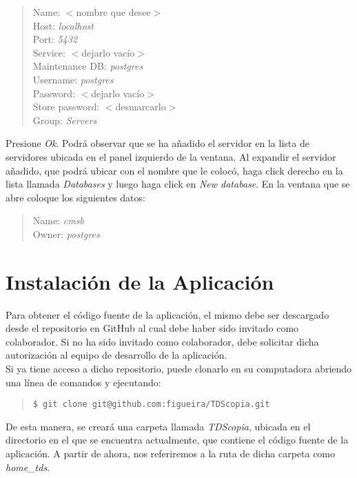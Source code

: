 \documentclass[12pt,a4paper]{article}
\begin{document}
\begin{quote}
Name: $<$nombre que desee$>$ \\
Host: \emph{localhost} \\
Port: \emph{5432} \\
Service: $<$dejarlo vacío$>$ \\
Maintenance DB: \emph{postgres} \\
Username: \emph{postgres} \\
Password: $<$dejarlo vacío$>$ \\
Store password: $<$desmarcarlo$>$ \\
Group: \emph{Servers}
\end{quote}

Presione \emph{Ok}. Podrá observar que se ha añadido el servidor en la lista de servidores ubicada en el panel izquierdo de la ventana. Al expandir el servidor añadido, que podrá ubicar con el nombre que le colocó, haga click derecho en la lista llamada \emph{Databases} y luego haga click en \emph{New database}. En la ventana que se abre coloque los siguientes datos:

\begin{quote}
Name: \emph{cmsb} \\
Owner: \emph{postgres}
\end{quote}

\newpage
\section{Instalación de la Aplicación}
Para obtener el código fuente de la aplicación, el mismo debe ser descargado desde el repositorio en GitHub al cual debe haber sido invitado como colaborador. Si no ha sido invitado como colaborador, debe solicitar dicha autorización al equipo de desarrollo de la aplicación. \\

Si ya tiene acceso a dicho repositorio, puede clonarlo en su computadora abriendo una línea de comandos y ejecutando:

\begin{quote}
\begin{verbatim}
$ git clone git@github.com:figueira/TDScopia.git
\end{verbatim}
\end{quote}

De esta manera, se creará una carpeta llamada \emph{TDScopia}, ubicada en el directorio en el que se encuentra actualmente, que contiene el código fuente de la aplicación. A partir de ahora, nos referiremos a la ruta de dicha carpeta como \emph{home\_tds}. \\
\end{document}
